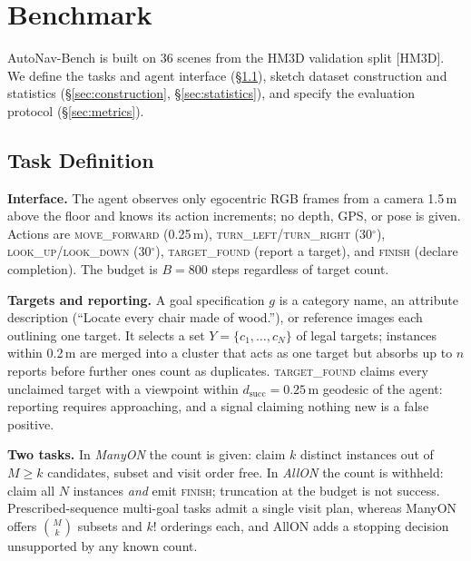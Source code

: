 
\section{Benchmark}
\label{sec:benchmark}

AutoNav-Bench is built on 36 scenes from the HM3D validation split [HM3D]. We define the tasks and agent interface (\S\ref{sec:task}), sketch dataset construction and statistics (\S\ref{sec:construction}, \S\ref{sec:statistics}), and specify the evaluation protocol (\S\ref{sec:metrics}).

\subsection{Task Definition}
\label{sec:task}

\textbf{Interface.}
The agent observes only egocentric RGB frames from a camera 1.5\,m above the floor and knows its action increments; no depth, GPS, or pose is given. Actions are \textsc{move\_forward} (0.25\,m), \textsc{turn\_left}/\textsc{turn\_right} (30$^\circ$), \textsc{look\_up}/\textsc{look\_down} (30$^\circ$), \textsc{target\_found} (report a target), and \textsc{finish} (declare completion). The budget is $B{=}800$ steps regardless of target count.

\textbf{Targets and reporting.}
A goal specification $g$ is a category name, an attribute description (``Locate every chair made of wood.''), or reference images each outlining one target. It selects a set $Y=\{c_1,\dots,c_N\}$ of legal targets; instances within 0.2\,m are merged into a cluster that acts as one target but absorbs up to $n$ reports before further ones count as duplicates. \textsc{target\_found} claims every unclaimed target with a viewpoint within $d_{\mathrm{succ}}{=}0.25$\,m geodesic of the agent: reporting requires approaching, and a signal claiming nothing new is a false positive.

\textbf{Two tasks.}
In \emph{ManyON} the count is given: claim $k$ distinct instances out of $M \geq k$ candidates, subset and visit order free. In \emph{AllON} the count is withheld: claim all $N$ instances \emph{and} emit \textsc{finish}; truncation at the budget is not success. Prescribed-sequence multi-goal tasks admit a single visit plan, whereas ManyON offers $\binom{M}{k}$ subsets and $k!$ orderings each, and AllON adds a stopping decision unsupported by any known count.

